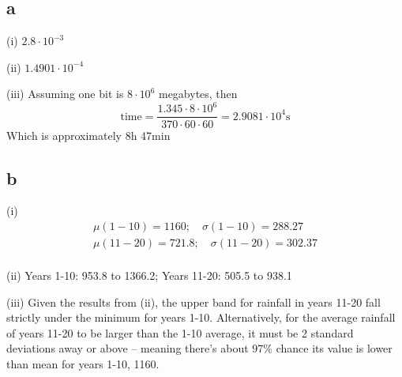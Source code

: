 \subsection{a}


(i) $2.8 \cdot 10^{-3}$

(ii) $1.4901 \cdot 10^{-4}$

(iii) Assuming one bit is $8\cdot 10^6$ megabytes, then
\begin{equation*}
    \text{time} = \frac{1.345 \cdot 8 \cdot 10^{6}}{370 \cdot 60 \cdot 60} = 2.9081 \cdot 10^4 \si{\second}
\end{equation*}
Which is approximately 8h 47min

\subsection{b}


(i)
\begin{equation*}\begin{split}
    \mu(1-10) = 1160; \quad \sigma(1-10)=288.27 \\
    \mu(11-20) = 721.8; \quad \sigma(11-20)=302.37 \\
\end{split}
\end{equation*}

(ii) Years 1-10: 953.8 to 1366.2; Years 11-20: 505.5 to 938.1



(iii) Given the results from (ii), the upper band for rainfall in years 11-20 fall strictly under the minimum for years 1-10.
Alternatively, for the average rainfall of years 11-20 to be larger than the 1-10 average, it must be 2 standard deviations away or above -- meaning there's about 97\% chance its value is lower than mean for years 1-10, 1160.